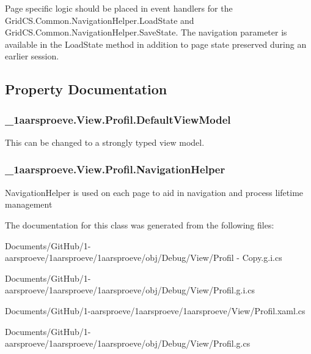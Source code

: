 Page specific logic should be placed in event handlers for the Grid\+C\+S.\+Common.\+Navigation\+Helper.\+Load\+State and Grid\+C\+S.\+Common.\+Navigation\+Helper.\+Save\+State. The navigation parameter is available in the Load\+State method in addition to page state preserved during an earlier session. 

\subsection{Property Documentation}
\hypertarget{class__1aarsproeve_1_1_view_1_1_profil_ad66fb294e243d2475bc5d16da6ddfeb0}{}
\subsubsection[{Default\+View\+Model}]{ \+\_\+1aarsproeve.\+View.\+Profil.\+Default\+View\+Model\hspace{0.3cm}{\ttfamily [get]}}\label{class__1aarsproeve_1_1_view_1_1_profil_ad66fb294e243d2475bc5d16da6ddfeb0}


This can be changed to a strongly typed view model. 

\hypertarget{class__1aarsproeve_1_1_view_1_1_profil_a16410b60470d2871c88c39af75b07130}{}
\subsubsection[{Navigation\+Helper}]{ \+\_\+1aarsproeve.\+View.\+Profil.\+Navigation\+Helper\hspace{0.3cm}{\ttfamily [get]}}\label{class__1aarsproeve_1_1_view_1_1_profil_a16410b60470d2871c88c39af75b07130}


Navigation\+Helper is used on each page to aid in navigation and process lifetime management 



The documentation for this class was generated from the following files\+:\begin{DoxyCompactItemize}
\item 
Documents/\+Git\+Hub/1-\/aarsproeve/1aarsproeve/1aarsproeve/obj/\+Debug/\+View/Profil -\/ Copy.\+g.\+i.\+cs\item 
Documents/\+Git\+Hub/1-\/aarsproeve/1aarsproeve/1aarsproeve/obj/\+Debug/\+View/Profil.\+g.\+i.\+cs\item 
Documents/\+Git\+Hub/1-\/aarsproeve/1aarsproeve/1aarsproeve/\+View/Profil.\+xaml.\+cs\item 
Documents/\+Git\+Hub/1-\/aarsproeve/1aarsproeve/1aarsproeve/obj/\+Debug/\+View/Profil.\+g.\+cs\end{DoxyCompactItemize}
